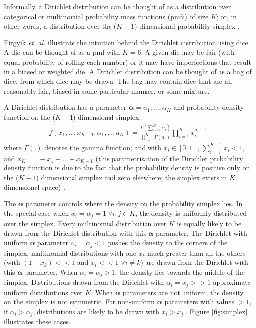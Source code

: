 Informally, a Dirichlet distribution can be thought of as a distribution over categorical or multinomial probability mass functions (pmfs) of size $K$; or, in other words, a distribution over the ($K-1$) dimensional probability simplex \cite{frigyik2010introduction,ng2011dirichlet}.

Firgyik \textit{et. al.} \cite{frigyik2010introduction} illustrate the intuition behind the Dirichlet distribution using dice. A die can be thought of as a pmf with $K=6$. A given die may be fair (with equal probability of rolling each number) or it may have imperfections that result in a biased or weighted die. A Dirichlet distribution can be thought of as a bag of dice, from which dice may be drawn. The bag may contain dice that are all reasonably fair, biased in some particular manner, or some mixture.

A Dirichlet distribution has a parameter $\boldsymbol{\alpha} = \alpha_1,...,\alpha_K$ and probability density function on the ($K-1$) dimensional simplex:
\begin{align}
f(x_1, ..., x_{K-1};\alpha_1,...,a_K)=\frac{\Gamma(\sum_{i=1}^K \alpha_i)}{\prod_{i=1}^K \Gamma(\alpha_i)}\prod_{i=1}^K x_i^{a_i-1} \label{eq:dir-pdf}
\end{align}
where $\Gamma(.)$ denotes the gamma function; and with $x_i \in [0,1]$, $\sum_{i=1}^{K-1} x_i < 1$, and $x_K = 1 - x_1 - ... - x_{K-1}$ (this parametrisation of the Dirichlet probability density function is due to the fact that the probability density is positive only on the ($K-1$) dimensional simplex and zero elsewhere; the simplex exists in $K$ dimensional space) \cite{frigyik2010introduction,hoadley1969compound,johnson1997discrete,kotz2004continuous,mosimann1962compound,ng2011dirichlet}.

The $\boldsymbol{\alpha}$ parameter controls where the density on the probability simplex lies. In the special case when $\alpha_i = \alpha_j = 1 \; \forall i,j \in K$, the density is uniformly distributed over the simplex. Every multinomial distribution over $K$ is equally likely to be drawn from the Dirichlet distribution with this $\boldsymbol{\alpha}$ parameter. The Dirichlet with uniform $\boldsymbol{\alpha}$ parameter $\alpha_i = \alpha_j < 1$ pushes the density to the corners of the simplex; multinomial distributions with one $x_k$ much greater than all the others (with $(1 - x_k) << 1$ and $x_i << 1 \; \forall i \ne k$) are drawn from the Dirichlet with this $\boldsymbol{\alpha}$ parameter. When $\alpha_i = \alpha_j > 1$, the density lies towards the middle of the simplex. Distributions drawn from the Dirichlet with $\alpha_i = \alpha_j >> 1$ approximate uniform distributions over $K$. When  $\boldsymbol{\alpha}$ parameters are not uniform, the density on the simplex is not symmetric. For non-uniform  $\boldsymbol{\alpha}$ parameters with values $>1$, if  $\alpha_i > \alpha_j$, distributions are likely to be drawn with $x_i > x_j$ \cite{frigyik2010introduction}. Figure \ref{fig:simplex} illustrates these cases.

